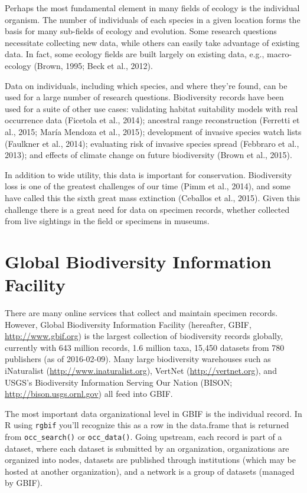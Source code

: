 \documentclass[author-year, review, 11pt]{components/elsarticle} %
\begin{document}
Perhaps the most fundamental element in many fields of ecology is the
individual organism. The number of individuals of each species in a
given location forms the basis for many sub-fields of ecology and
evolution. Some research questions necessitate collecting new data,
while others can easily take advantage of existing data. In fact, some
ecology fields are built largely on existing data, e.g., macro-ecology
(Brown, 1995; Beck et al., 2012).

Data on individuals, including which species, and where they're found,
can be used for a large number of research questions. Biodiversity
records have been used for a suite of other use cases: validating
habitat suitability models with real occurrence data (Ficetola et al.,
2014); ancestral range reconstruction (Ferretti et al., 2015; Mar{í}a
Mendoza et al., 2015); development of invasive species watch lists
(Faulkner et al., 2014); evaluating risk of invasive species spread
(Febbraro et al., 2013); and effects of climate change on future
biodiversity (Brown et al., 2015).

In addition to wide utility, this data is important for conservation.
Biodiversity loss is one of the greatest challenges of our time (Pimm et
al., 2014), and some have called this the sixth great mass extinction
(Ceballos et al., 2015). Given this challenge there is a great need for
data on specimen records, whether collected from live sightings in the
field or specimens in museums.

\section{Global Biodiversity Information
Facility}\label{global-biodiversity-information-facility}

There are many online services that collect and maintain specimen
records. However, Global Biodiversity Information Facility (hereafter,
GBIF, \href{http://www.gbif.org}{\url{http://www.gbif.org}}) is the
largest collection of biodiversity records globally, currently with 643
million records, 1.6 million taxa, 15,450 datasets from 780 publishers
(as of 2016-02-09). Many large biodiversity warehouses such as
iNaturalist
(\href{http://www.inaturalist.org}{\url{http://www.inaturalist.org}}),
VertNet (\href{http://vertnet.org}{\url{http://vertnet.org}}), and
USGS's Biodiversity Information Serving Our Nation (BISON;
\href{http://bison.usgs.ornl.gov}{\url{http://bison.usgs.ornl.gov}}) all
feed into GBIF.

The most important data organizational level in GBIF is the individual
record. In R using \texttt{rgbif} you'll recognize this as a row in the
data.frame that is returned from \texttt{occ\_search()} or
\texttt{occ\_data()}. Going upstream, each record is part of a dataset,
where each dataset is submitted by an organization, organizations are
organized into nodes, datasets are published through institutions (which
may be hosted at another organization), and a network is a group of
datasets (managed by GBIF).
\end{document}

